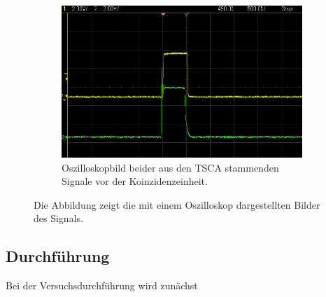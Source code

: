\begin{figure}[H]
\begin{subfigure}[t]{0.495\textwidth}
		\centering
		\includegraphics[width=\textwidth]{img/BeideSignaleVorKoinzidenzeinheit}
		\caption{Oszilloskopbild beider aus den TSCA stammenden Signale vor der Koinzidenzeinheit.}
		\label{BeideSignaleVorKoinzidenzeinheit}
	\end{subfigure}
	\caption{Die Abbildung zeigt die mit einem Oszilloskop dargestellten Bilder des Signals.}
	\label{Oszilloskopbilder}
\end{figure}
\noindent 

\subsection{Durchführung}

Bei der Versuchsdurchführung wird zunächst 